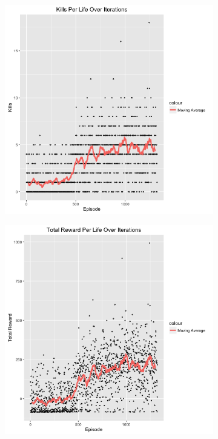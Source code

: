 \documentclass{article}
\begin{document}
\begin{multicols}{2}
\begin{figure}[H]
\caption{Results on Easy Difficulty}
\begin{subfigure}{.25\textwidth}
  \centering
  \includegraphics[scale=0.27]{./kills.png}
  \caption{}
  \label{fig:sfig1}
\end{subfigure}%
\begin{subfigure}{.25\textwidth}
  \centering
  \includegraphics[scale=0.27]{./reward.png}

\end{subfigure}
\end{figure}
\end{multicols}
\end{document}

